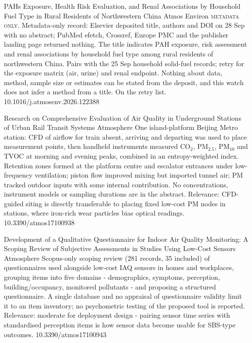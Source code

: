 \documentclass[10pt]{article}
\begin{document}
{PAHs Exposure, Health Risk Evaluation, and Renal Associations by Household Fuel Type in Rural Residents of Northwestern China}
{Atmos Environ}
{\textsc{metadata only.} Metadata-only record: Elsevier deposited title, authors and DOI on 28 Sep with no abstract; PubMed efetch, Crossref, Europe PMC and the publisher landing page returned nothing. The title indicates PAH exposure, risk assessment and renal associations by household fuel type among rural residents of northwestern China. Pairs with the 25 Sep household solid-fuel records; retry for the exposure matrix (air, urine) and renal endpoint. Nothing about data, method, sample size or estimates can be stated from the deposit, and this watch does not infer a method from a title. On the retry list.}
{10.1016/j.atmosenv.2026.122388}

{Research on Comprehensive Evaluation of Air Quality in Underground Stations of Urban Rail Transit Systems}
{Atmosphere}
{One island-platform Beijing Metro station: CFD of airflow for train absent, arriving and departing was used to place measurement points, then handheld instruments measured CO$_2$, PM$_{2.5}$, PM$_{10}$ and TVOC at morning and evening peaks, combined in an entropy-weighted index. Retention zones formed at the platform centre and escalator entrances under low-frequency ventilation; piston flow improved mixing but imported tunnel air; PM tracked outdoor inputs with some internal contribution. No concentrations, instrument models or sampling durations are in the abstract. Relevance: CFD-guided siting is directly transferable to placing fixed low-cost PM nodes in stations, where iron-rich wear particles bias optical readings.}
{10.3390/atmos17100938}

{Development of a Qualitative Questionnaire for Indoor Air Quality Monitoring: A Scoping Review of Subjective Assessments in Studies Using Low-Cost Sensors}
{Atmosphere}
{Scopus-only scoping review (281 records, 35 included) of questionnaires used alongside low-cost IAQ sensors in homes and workplaces, grouping items into five domains - demographics, symptoms, perception, building/occupancy, monitored pollutants - and proposing a structured questionnaire. A single database and no appraisal of questionnaire validity limit it to an item inventory; no psychometric testing of the proposed tool is reported. Relevance: moderate for deployment design - pairing sensor time series with standardised perception items is how sensor data become usable for SBS-type outcomes.}
{10.3390/atmos17100943}
\end{document}
